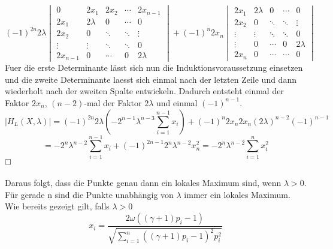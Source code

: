 \documentclass[11pt]{scrartcl}
\begin{document}
			$$
			(-1)^{2n}2\lambda
			\begin{vmatrix}
			0 & 2x_{1} & 2x_{2} & \cdots & 2x_{n-1} \\
			2x_{1} & 2\lambda & 0 & \cdots & 0 \\
			2x_{2} & 0 & \ddots & \ddots & \vdots \\
			\vdots & \vdots & \ddots & \ddots & 0 \\
			2x_{n-1} &  0 & \cdots & 0 & 2\lambda
			\end{vmatrix}
			+(-1)^{n}2x_{n}
			\begin{vmatrix}
			2x_{1} & 2\lambda & 0 & \cdots & 0 \\
			2x_{2} & 0 & \ddots & \ddots & \vdots \\
			\vdots & \vdots & \ddots & \ddots & 0 \\
			\vdots & 0 & \cdots & 0 & 2\lambda \\
			2x_{n} &  0 & \cdots & \cdots & 0
			\end{vmatrix}
			$$
			Fuer die erste Determinante lässt sich nun die Induktionsvoraussetzung einsetzen und die zweite Determinante laesst sich einmal nach der letzten Zeile und dann wiederholt nach der zweiten Spalte entwickeln. Dadurch entsteht einmal der Faktor \(2x_{n}\), \((n-2)\)-mal der Faktor \(2\lambda\) und einmal \((-1)^{n-1}\).
			$$
			|H_{L}(X,\lambda)|=(-1)^{2n}2\lambda(-2^{n-1}\lambda^{n-3}\sum_{i=1}^{n-1}x_{i})+(-1)^{n}2x_{n}2x_{n}(2\lambda)^{n-2}(-1)^{n-1}
			$$
			$$
			=-2^{n}\lambda^{n-2}\sum_{i=1}^{n-1}x_{i}+(-1)^{2n-1}2^{n}\lambda^{n-2}x_{n}^{2}
			=-2^n\lambda^{n-2}\sum_{i=1}^{n}x_{i}^2
			$$
			$\hfill\square$\\\\
			Daraus folgt, dass die Punkte genau dann ein lokales Maximum sind, wenn \(\lambda>0\). Für gerade n sind die Punkte unabhängig von \(\lambda\) immer ein lokales Maximum. Wie bereits gezeigt gilt, falls \(\lambda>0\)
			$$
			x_{i}=\frac{2\omega((\gamma +1)p_{i}-1)}{\sqrt{\sum_{i=1}^{n}((\gamma +1)p_{i}-1)^2p_{i}^2}}
			$$
\end{document}
